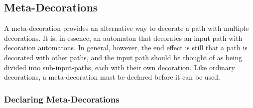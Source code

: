 \subsection{Meta-Decorations}
\label{section-base-meta-decorations}

A meta-decoration provides an alternative way to decorate a path with multiple
decorations. It is, in essence, an automaton that decorates an input path with
decoration automatons. In general, however, the end effect is still that a path
is decorated with other paths, and the input path should be thought of as being
divided into sub-input-paths, each with their own decoration. Like ordinary
decorations, a meta-decoration must be declared before it can be used.


\subsubsection{Declaring Meta-Decorations}

